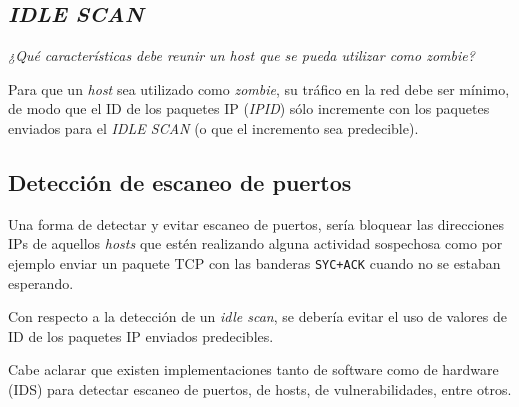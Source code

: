 \subsection{\emph{IDLE SCAN}}

\emph{¿Qué características debe reunir un host que se pueda utilizar como zombie?} 

Para que un \emph{host} sea utilizado como \emph{zombie}, su tráfico en la red debe ser mínimo, de modo que el ID de los paquetes IP (\emph{IPID}) sólo incremente con los paquetes enviados para el \emph{IDLE SCAN} (o que el incremento sea predecible).

\subsection{Detección de escaneo de puertos}

Una forma de detectar y evitar escaneo de puertos, sería bloquear las direcciones IPs de aquellos \emph{hosts} que estén realizando alguna actividad sospechosa como por ejemplo enviar un paquete TCP con las banderas \texttt{SYC+ACK} cuando no se estaban esperando.

Con respecto a la detección de un \emph{idle scan}, se debería evitar el uso de valores de ID de los paquetes IP enviados predecibles.  

Cabe aclarar que existen implementaciones tanto de software como de hardware (IDS) para detectar escaneo de puertos, de hosts, de vulnerabilidades, entre otros.
















\clearpage
\printbibliography


